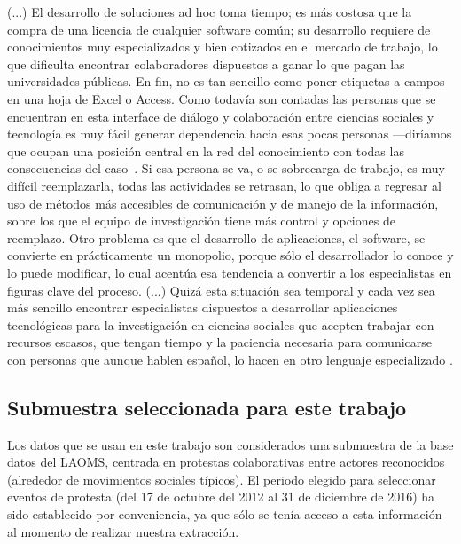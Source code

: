 \documentclass[letterpaper, 11pt]{book}
\theoremstyle{definition}
\theoremstyle{remark}
\begin{document}
\begin{center}
    \begin{minipage}{0.9\linewidth}
        {\setlength{\parindent}{12pt}\small
        (...)
        El desarrollo de soluciones ad hoc toma tiempo; es más costosa que la compra de una licencia de cualquier software común; su desarrollo requiere de conocimientos muy especializados y bien cotizados en el mercado de trabajo, lo que dificulta encontrar colaboradores dispuestos a ganar lo que pagan las universidades públicas. 
        En fin, no es tan sencillo como poner etiquetas a campos en una hoja de Excel o Access. Como todavía son contadas las personas que se encuentran en esta interface de diálogo y colaboración entre ciencias sociales y tecnología es muy fácil generar dependencia hacia esas pocas personas ---diríamos que ocupan una posición central en la red del conocimiento con todas las consecuencias del caso--. 
        Si esa persona se va, o se sobrecarga de trabajo, es muy difícil reemplazarla, todas las actividades se retrasan, lo que obliga a regresar al uso de métodos más accesibles de comunicación y de manejo de la información, sobre los que el equipo de investigación tiene más control y opciones de reemplazo. 
        Otro problema es que el desarrollo de aplicaciones, el software, se convierte en prácticamente un monopolio, porque sólo el desarrollador lo conoce y lo puede modificar, lo cual acentúa esa tendencia a convertir a los especialistas en figuras clave del proceso. 
        (...) Quizá esta situación sea temporal y cada vez sea más sencillo encontrar especialistas dispuestos a desarrollar aplicaciones tecnológicas para la investigación  en ciencias sociales que acepten trabajar con recursos escasos, que tengan tiempo y la paciencia necesaria para comunicarse con personas que aunque hablen español, lo hacen en otro lenguaje especializado \normalsize  \citep[237--238]{2015_Cadena_Tecnologia}.
        }
    \end{minipage}
\end{center}



\subsection{Submuestra seleccionada para este trabajo}
\label{sec:submuestra}

Los datos que se usan en este trabajo son considerados una submuestra de la base datos del LAOMS, centrada en protestas colaborativas entre actores reconocidos (alrededor de movimientos sociales típicos). 
El periodo elegido para seleccionar eventos de protesta (del 17 de octubre del 2012 al 31 de diciembre de 2016) ha sido establecido por conveniencia, ya que sólo se tenía acceso a esta información al momento de realizar nuestra extracción. 
\end{document}
